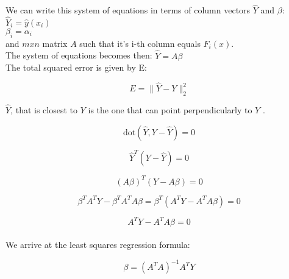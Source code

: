 \documentclass{article}
\begin{document}
We can write this system of equations in terms of column vectors $\hat{Y}$ and $\beta$:\\

$\hat{Y}_i = \hat{y}(x_i)$\\
$\beta_i = {\alpha}_i$\\

and $m x n$ matrix $A$ such that it's i-th column equals $F_i(x)$.\\

The system of equations becomes then: $\hat{Y} = A{\beta}$\\

The total squared error is given by E:

$$E = \|{\hat{Y} - Y}\|_{2}^2$$

$\hat{Y}$, that is closest to $Y$ is the one that can point perpendicularly to $Y$ .

$${\text{dot}}(\hat{Y}, Y - \hat{Y}) = 0$$

$$\hat{Y}^T (Y - \hat{Y}) = 0$$

$$(A{\beta})^T(Y - A{\beta}) = 0$$

$${\beta}^T A^T Y - {\beta}^T A^T A {\beta} = {\beta}^T(A^T Y - A^T A {\beta}) = 0$$

$$A^T Y - A^T A {\beta} = 0$$\\

We arrive at the least squares regression formula:

$${\beta} = (A^T A)^{-1} A^T Y$$
\end{document}
